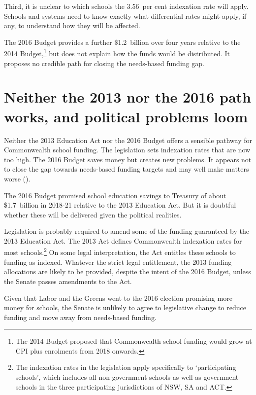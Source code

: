 \documentclass{grattan}
\begin{document}
Third, it is unclear to which schools the 3.56~per cent indexation rate will apply. Schools and systems need to know exactly what differential rates might apply, if any, to understand how they will be affected.

The 2016 Budget provides a further \$1.2~billion over four years relative to the 2014 Budget,\footnote{The 2014 Budget proposed that Commonwealth school funding would grow at CPI plus enrolments from 2018 onwards.} but does not explain how the funds would be distributed.
It proposes no credible path for closing the needs-based funding gap.

\section{Neither the 2013 nor the 2016 path works, and political problems loom}\label{sec:neither-the-2013-nor-the-2016-path-works-and-political-problems-loom}

Neither the 2013 Education Act nor the 2016 Budget offers a sensible pathway for Commonwealth school funding.
The legislation sets indexation rates that are now too high.
The 2016 Budget saves money but creates new problems.
It appears not to close the gap towards needs-based funding targets and may well make matters worse ().

The 2016 Budget promised school education savings to Treasury of about \$1.7~billion in 2018-21 relative to the 2013 Education Act.
But it is doubtful whether these will be delivered given the political realities.

Legislation is probably required to amend some of the funding guaranteed by the 2013 Education Act.
The 2013 Act defines Commonwealth indexation rates for most schools.\footnote{The indexation rates in the legislation apply specifically to `participating schools', which includes all non-government schools as well as government schools in the three participating jurisdictions of NSW, SA and ACT.}
On some legal interpretation, the Act entitles these schools to funding as indexed.
Whatever the strict legal entitlement, the 2013 funding allocations are likely to be provided, despite the intent of the 2016 Budget, unless the Senate passes amendments to the Act.

Given that Labor and the Greens went to the 2016 election promising more money for schools, the Senate is unlikely to agree to  legislative change to reduce funding and move away from needs-based funding.
\end{document}
